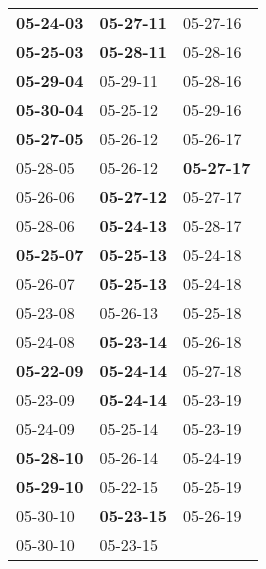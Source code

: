 \begin{supertabular}{p{0.33\columnwidth}p{0.33\columnwidth}p{0.33\columnwidth}}
 \textbf{05-24-03\textsuperscript{}} &  \textbf{05-27-11\textsuperscript{}} &           05-27-16\textsuperscript{} \\
 \textbf{05-25-03\textsuperscript{}} &  \textbf{05-28-11\textsuperscript{}} &           05-28-16\textsuperscript{} \\
 \textbf{05-29-04\textsuperscript{}} &           05-29-11\textsuperscript{} &           05-28-16\textsuperscript{} \\
 \textbf{05-30-04\textsuperscript{}} &           05-25-12\textsuperscript{} &           05-29-16\textsuperscript{} \\
 \textbf{05-27-05\textsuperscript{}} &           05-26-12\textsuperscript{} &           05-26-17\textsuperscript{} \\
          05-28-05\textsuperscript{} &           05-26-12\textsuperscript{} &  \textbf{05-27-17\textsuperscript{}} \\
          05-26-06\textsuperscript{} &  \textbf{05-27-12\textsuperscript{}} &           05-27-17\textsuperscript{} \\
          05-28-06\textsuperscript{} &  \textbf{05-24-13\textsuperscript{}} &           05-28-17\textsuperscript{} \\
 \textbf{05-25-07\textsuperscript{}} &  \textbf{05-25-13\textsuperscript{}} &           05-24-18\textsuperscript{} \\
          05-26-07\textsuperscript{} &  \textbf{05-25-13\textsuperscript{}} &           05-24-18\textsuperscript{} \\
          05-23-08\textsuperscript{} &           05-26-13\textsuperscript{} &           05-25-18\textsuperscript{} \\
          05-24-08\textsuperscript{} &  \textbf{05-23-14\textsuperscript{}} &           05-26-18\textsuperscript{} \\
 \textbf{05-22-09\textsuperscript{}} &  \textbf{05-24-14\textsuperscript{}} &           05-27-18\textsuperscript{} \\
          05-23-09\textsuperscript{} &  \textbf{05-24-14\textsuperscript{}} &           05-23-19\textsuperscript{} \\
          05-24-09\textsuperscript{} &           05-25-14\textsuperscript{} &           05-23-19\textsuperscript{} \\
 \textbf{05-28-10\textsuperscript{}} &           05-26-14\textsuperscript{} &           05-24-19\textsuperscript{} \\
 \textbf{05-29-10\textsuperscript{}} &           05-22-15\textsuperscript{} &           05-25-19\textsuperscript{} \\
          05-30-10\textsuperscript{} &  \textbf{05-23-15\textsuperscript{}} &           05-26-19\textsuperscript{} \\
          05-30-10\textsuperscript{} &           05-23-15\textsuperscript{} &                                      \\
\end{supertabular}
